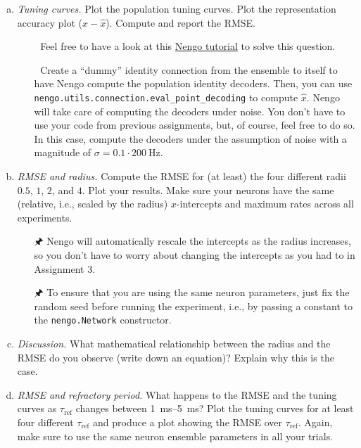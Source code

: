 	\begin{enumerate}[a)]
		\item {} \emph{Tuning curves.} Plot the population tuning curves. Plot the representation accuracy plot ($x - \hat{x}$). Compute and report the RMSE.
		\begin{itemize}
			\item[{\symbolfont 🐍}]  Feel free to have a look at this \href{https://www.nengo.ai/nengo/examples/usage/tuning-curves.html}{Nengo tutorial} to solve this question.
			\item[{\symbolfont 🐍}] Create a \enquote{dummy} identity connection from the ensemble to itself to have Nengo compute the population identity decoders. Then, you can use \texttt{nengo.utils.connection.eval\_point\_decoding} to compute $\hat{x}$. Nengo will take care of computing the decoders under noise. You don't have to use your code from previous assignments, but, of course, feel free to do so. In this case, compute the decoders under the assumption of noise with a magnitude of $\sigma = 0.1 \cdot \SI{200}{\hertz}$.
		\end{itemize}
		\item {} \emph{RMSE and radius.} Compute the RMSE for (at least) the four different radii $0.5$, $1$, $2$, and $4$. Plot your results. Make sure your neurons have the same (relative, i.e., scaled by the radius) $x$-intercepts and maximum rates across all experiments.
		\begin{itemize}
			\item[{\symbolfont 🖈}] Nengo will automatically rescale the intercepts as the radius increases, so you don't have to worry about changing the intercepts as you had to in Assignment 3.
			\item[{\symbolfont 🖈}] To ensure that you are using the same neuron parameters, just fix the random seed before running the experiment, i.e., by passing a constant to the \texttt{nengo.Network} constructor.
		\end{itemize}
		\item {} \emph{Discussion.} What mathematical relationship between the radius and the RMSE do you observe (write down an equation)? Explain why this is the case.
		\item {} \emph{RMSE and refractory period.} What happens to the RMSE and the tuning curves as $\tau_\mathrm{ref}$ changes between \SIrange{1}{5}{\milli\second}? Plot the tuning curves for at least four different $\tau_\mathrm{ref}$ and produce a plot showing the RMSE over $\tau_\mathrm{ref}$. Again, make sure to use the same neuron ensemble parameters in all your trials.

\end{enumerate}
